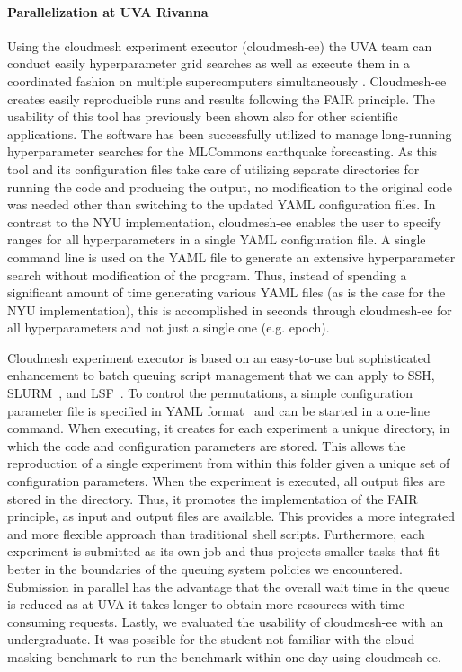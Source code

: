 \documentclass[sigplan,screen]{acmart}
\begin{document}
\paragraph{Parallelization at UVA Rivanna} Using the cloudmesh experiment executor (cloudmesh-ee) the UVA team can conduct easily hyperparameter grid searches as well as execute them in a coordinated fashion on multiple supercomputers simultaneously \cite{las-2023-ai-workflow,github-cloudmesh-ee,las-2023-mlcommons-edu-eq}. Cloudmesh-ee creates easily reproducible runs and results following the FAIR principle. The usability of this tool has previously been shown also for other scientific applications. The software has been successfully utilized to manage long-running hyperparameter searches for the MLCommons earthquake forecasting. As this tool and its configuration files take care of utilizing separate directories for running the code and producing the output, no modification to the original code was needed other than switching to the updated YAML configuration files. In contrast to the NYU implementation, cloudmesh-ee enables the user to specify ranges for all hyperparameters in a single YAML configuration file. A single command line is used on the YAML file to generate an extensive hyperparameter search without modification of the program. Thus, instead of spending a significant amount of time generating various YAML files (as is the case for the NYU implementation), this is accomplished in seconds through cloudmesh-ee for all hyperparameters and not just a single one (e.g. epoch).

Cloudmesh experiment executor is based on an easy-to-use but sophisticated enhancement to batch queuing script management that we can apply to SSH, SLURM~\cite{www-slurm}, and LSF~\cite{www-lsf}. To control the permutations, a simple configuration parameter file is specified in YAML format~\cite{github-cloudmesh-ee} and can be started in a one-line command. 
When executing, it creates for each experiment a unique directory, in which the code and configuration parameters are stored. This allows the reproduction of a single experiment from within this folder given a unique set of configuration parameters. When the experiment is executed, all output files are stored in the directory. Thus, it promotes the implementation of the FAIR principle, as input and output files are available.
This provides a more integrated and more flexible approach than traditional shell scripts.
Furthermore, each experiment is submitted as its own job and thus projects smaller tasks that fit better in the boundaries of the queuing system policies we encountered. Submission in parallel has the advantage that the overall wait time in the queue is reduced as at UVA it takes longer to obtain more resources with time-consuming requests. Lastly, we evaluated the usability of cloudmesh-ee with an undergraduate. It was possible for the student not familiar with the cloud masking benchmark to run the benchmark within one day \cite{las-2023-escience-cloudmask} using cloudmesh-ee.
\end{document}
